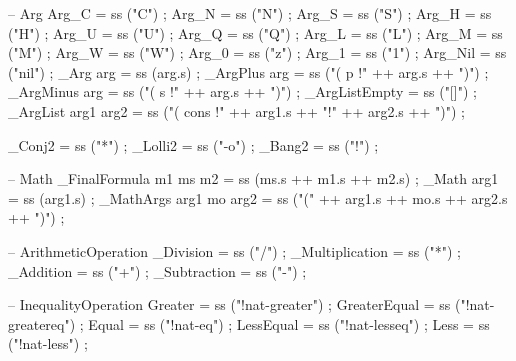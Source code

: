 \begin{lstgf}
{        -- Arg
        Arg_C                           = ss ("C") ;
        Arg_N                           = ss ("N") ;
        Arg_S                           = ss ("S") ;
        Arg_H                           = ss ("H") ;
        Arg_U                           = ss ("U") ;
        Arg_Q                           = ss ("Q") ;
        Arg_L                           = ss ("L") ;
        Arg_M                           = ss ("M") ;
        Arg_W                           = ss ("W") ;
        Arg_0                           = ss ("z") ;
        Arg_1                           = ss ("1") ;
        Arg_Nil                         = ss ("nil") ;
        _Arg arg                        = ss (arg.s) ;
        _ArgPlus arg                    = ss ("( p !" ++ arg.s ++ ")") ;
        _ArgMinus arg                   = ss ("( s !" ++ arg.s ++ ")") ;
        _ArgListEmpty                   = ss ("[]") ;
        _ArgList arg1 arg2              = ss ("( cons !" ++ arg1.s ++ "!" ++ arg2.s ++ ")") ;
        
        _Conj2                          = ss ("*") ;
        _Lolli2                         = ss ("-o") ;
        _Bang2                          = ss ("!") ;

        -- Math
        _FinalFormula m1 ms m2          = ss (ms.s ++ m1.s ++ m2.s) ;
        _Math arg1                      = ss (arg1.s) ;
        _MathArgs arg1 mo arg2          = ss ("(" ++ arg1.s ++ mo.s ++ arg2.s ++ ")") ;

        -- ArithmeticOperation
        _Division                       = ss ("/") ;
        _Multiplication                 = ss ("*") ;
        _Addition                       = ss ("+") ;
        _Subtraction                    = ss ("-") ;

        -- InequalityOperation
        Greater                         = ss ("!nat-greater") ;
        GreaterEqual                    = ss ("!nat-greatereq") ;
        Equal                           = ss ("!nat-eq") ;
        LessEqual                       = ss ("!nat-lesseq") ;
        Less                            = ss ("!nat-less") ;
}
\end{lstgf}